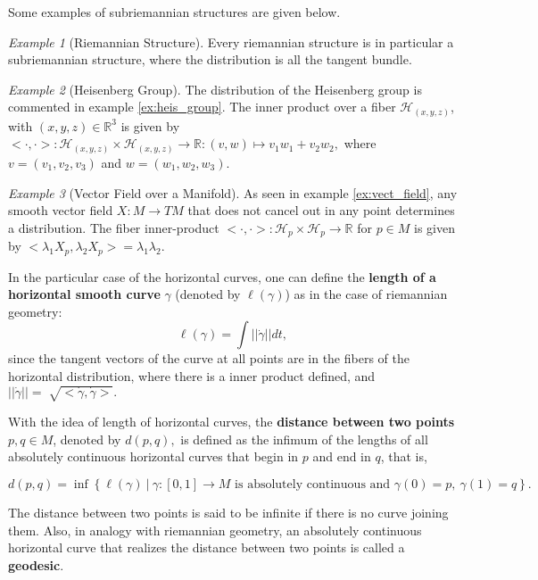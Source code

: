 \documentclass[12pt, letterpaper, reqno]{amsart}
\theoremstyle{definition}
\theoremstyle{plain}
\theoremstyle{remark}
\newtheorem{ex}{Example}
\begin{document}
Some examples of subriemannian structures are given below.
\begin{ex}[Riemannian Structure]\label{ex:riem_geo2}
	Every riemannian structure is in particular a subriemannian structure, where the distribution is all the tangent bundle.
\end{ex}

\begin{ex}[Heisenberg Group]\label{ex:heis_group2}
	The distribution of the Heisenberg group is commented in example \ref{ex:heis_group}. The inner product over a fiber $ \mathcal{H}_{(x,y,z)} $, with $ (x,y,z)\in \mathbb{R}^3 $  is given by $<\cdot,\cdot>:  \mathcal{H}_{(x,y,z)}\times\mathcal{H}_{(x,y,z)} \rightarrow { \mathbb{R} }:(v,w)\mapsto v_1w_1+v_2w_2,$ where $ v=(v_1,v_2,v_3) $ and $ w=(w_1,w_2,w_3). $  

\end{ex}
\begin{ex}[Vector Field over a Manifold]\label{ex:vect_field2}
	As seen in example \ref{ex:vect_field}, any smooth vector field $ X: M \rightarrow TM$ that does not cancel out in any point determines a distribution.  The fiber inner-product $ <\cdot,\cdot>: \mathcal{H}_p \times \mathcal{H}_p \rightarrow \mathbb{R} $ for $ p\in M $  is given by $<\lambda_1 X_p,\lambda_2 X_p>=\lambda_1 \lambda_2.$
\end{ex}
In the particular case of the horizontal curves, one can define the \textbf{length of a horizontal smooth curve} $ \gamma $ (denoted by $ \ell(\gamma) $) as in the case of riemannian geometry:
$$ \ell(\gamma) = \int ||\dot{\gamma}|| dt, $$ 
since the tangent vectors of the curve at all points are in the fibers of the horizontal distribution, where there is a inner product defined, and $ ||\dot{\gamma}||= \sqrt[]{<\dot{\gamma}, \dot{\gamma}>}.  $   

With the idea of length of horizontal curves, the \textbf{distance between two points} $ p,q\in M $, denoted by $ d(p,q), $   is defined as the infimum of the lengths of all absolutely continuous horizontal curves that begin in $ p $ and end in $ q $, that is, 

$$ d(p,q) = \operatorname{inf} \left\{ \ell(\gamma) \ |\ \gamma:[0,1] \rightarrow {M} \text{ is absolutely continuous and }\gamma(0)=p, \ \gamma(1)=q \right\}. $$ 

The distance between two points is said to be infinite if there is no curve joining them. Also, in analogy with riemannian geometry, an absolutely continuous horizontal curve that realizes the distance between two points is called a \textbf{geodesic}. 



\nocite{*}

\end{document}
